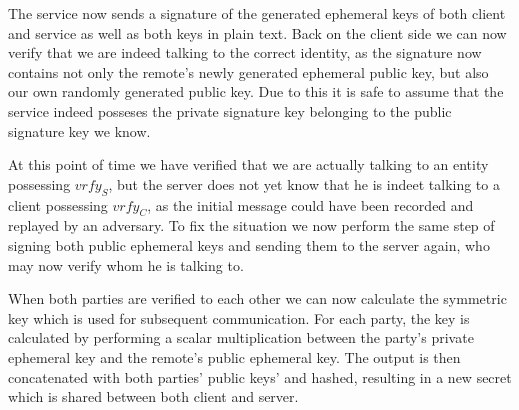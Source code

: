 The service now sends a signature of the generated ephemeral keys of both client and service as well as both keys in plain text.
Back on the client side we can now verify that we are indeed talking to the correct identity, as the signature now contains not only the remote's newly generated ephemeral public key, but also our own randomly generated public key.
Due to this it is safe to assume that the service indeed posseses the private signature key belonging to the public signature key we know.

At this point of time we have verified that we are actually talking to an entity possessing $vrfy_S$, but the server does not yet know that he is indeet talking to a client possessing $vrfy_C$, as the initial message could have been recorded and replayed by an adversary.
To fix the situation we now perform the same step of signing both public ephemeral keys and sending them to the server again, who may now verify whom he is talking to.

When both parties are verified to each other we can now calculate the symmetric key which is used for subsequent communication.
For each party, the key is calculated by performing a scalar multiplication between the party's private ephemeral key and the remote's public ephemeral key.
The output is then concatenated with both parties' public keys' and hashed, resulting in a new secret which is shared between both client and server.

